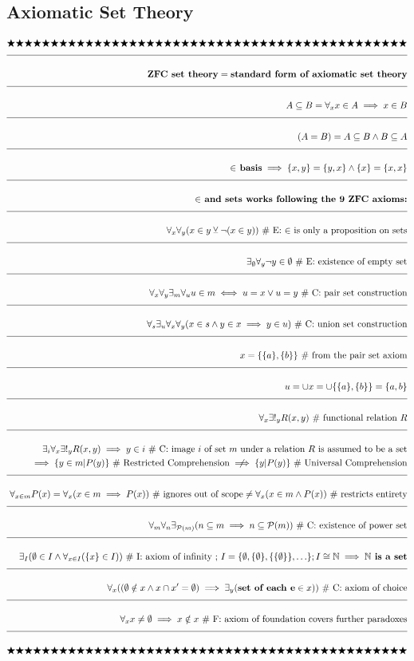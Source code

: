 \documentclass[a4paper]{article}
\def\ml{\mleft}
\def\mr{\mright}
\newcommand{\melazy}{\bigstar\bigstar\bigstar\bigstar\bigstar\bigstar\bigstar\bigstar\bigstar\bigstar\bigstar\bigstar\bigstar\bigstar\bigstar\bigstar\bigstar\bigstar\bigstar\bigstar\bigstar\bigstar\bigstar\bigstar\bigstar\bigstar\bigstar\bigstar\bigstar\bigstar\bigstar\bigstar\bigstar\bigstar\bigstar\bigstar\bigstar\bigstar\bigstar\bigstar\bigstar\bigstar\bigstar\bigstar\bigstar\bigstar}
\newcommand{\eqComment}[1]{\text{  \# #1}}
\newcommand{\eqSep}{\text{ ;  }}
\newcommand{\n}{\\[1.5ex] \hline \nonumber \\[0ex]}
\newcommand{\m}{\nonumber \\}
\begin{document}
\subsection{Axiomatic Set Theory}
\begin{tcolorbox}
\begin{align}
   \melazy
\n \textbf{ZFC set theory} = \textbf{standard form of axiomatic set theory}
\n A \subseteq B = \forall_x x \in A \implies x \in B
\n \ml(A = B\mr) = A \subseteq B \land B \subseteq A
\n \textbf{$\in$ basis} \implies \{x, y\} = \{y, x\} \land \{x\} = \{x, x\}
\n \textbf{$\in$ and sets works following the 9 ZFC axioms:}
\n \forall_x \forall_y \ml(x \in y \veebar \lnot\ml(x \in y\mr)\mr) \eqComment{E: $\in$ is only a proposition on sets}
\n \exists_\emptyset \forall_y \lnot y \in \emptyset \eqComment{E: existence of empty set}
\n \forall_x \forall_y \exists_m \forall_u u \in m \iff u = x \lor u = y \eqComment{C: pair set construction}
\n \forall_s \exists_u \forall_x \forall_y \ml(x \in s \land y \in x \implies y \in u\mr) \eqComment{C: union set construction}
\n x = \{\{a\}, \{b\}\} \eqComment{from the pair set axiom}
\n u = \cup x = \cup \{\{a\}, \{b\}\} = \{a, b\}
\n \forall_x \exists!_y R\ml(x,y\mr) \eqComment{functional relation $R$}
\n \exists_i \forall_x \exists!_y R\ml(x,y\mr) \implies y \in i
\eqComment{C: image $i$ of set $m$ under a relation $R$ is assumed to be a set}
\m \implies \{y \in m | P\ml(y\mr)\} \eqComment{Restricted Comprehension} \centernot\implies  \{y | P\ml(y\mr)\} \eqComment{Universal Comprehension}
\n \forall_{x \in m} P\ml(x\mr) = \forall_x \ml(x \in m \implies P\ml(x\mr)\mr) \eqComment{ignores out of scope} \neq \forall_x \ml(x \in m \land P\ml(x\mr)\mr) \eqComment{restricts entirety}
\n \forall_m \forall_n \exists_{\mathcal{P}\ml(m\mr)} \ml(n \subseteq m \implies n \subseteq \mathcal{P}\ml(m\mr)\mr) \eqComment{C: existence of power set}
\n \exists_I \ml(\emptyset \in I \land \forall_{x \in I} \ml(\{x\} \in I\mr)\mr) \eqComment{I: axiom of infinity} \eqSep I = \{\emptyset, \{\emptyset\}, \{\{\emptyset\}\}, \ldots\} ; I \cong \mathbb{N} \implies \textbf{$\mathbb{N}$ is a set}
\n \forall_x \ml(\ml(\emptyset \notin x \land x \cap x' = \emptyset\mr) \implies \exists_y \ml(\textbf{set of each e} \in x\mr)\mr) \eqComment{C: axiom of choice}
\n \forall_x x \neq \emptyset \implies x \notin x \eqComment{F: axiom of foundation covers further paradoxes}
\n \melazy
\end{align}
\end{tcolorbox}
\end{document}
